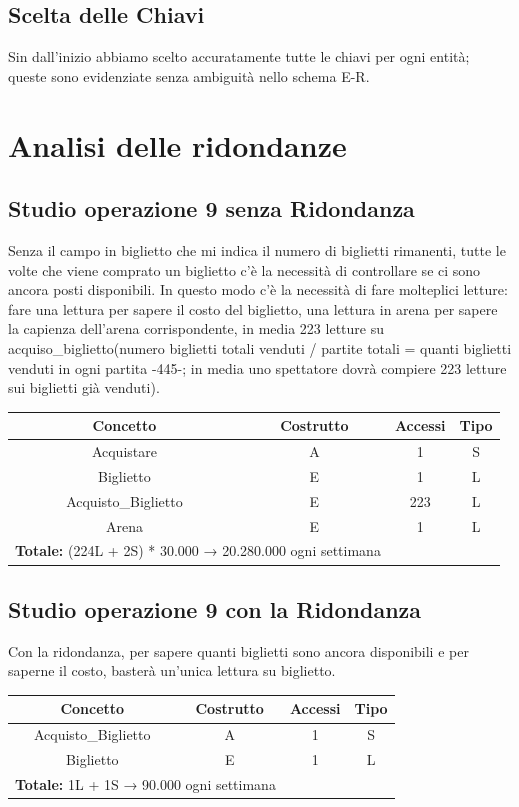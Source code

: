 \documentclass[a4paper,12pt]{report}
\begin{document}
\subsection*{Scelta delle Chiavi}
Sin dall'inizio abbiamo scelto accuratamente tutte le chiavi per ogni entità; queste sono evidenziate senza ambiguità nello schema E-R.
\section{Analisi delle ridondanze}
\subsection*{Studio operazione 9 senza Ridondanza}
Senza il campo in biglietto che mi indica il numero di biglietti rimanenti, tutte le volte che viene comprato un biglietto c'è la necessità di controllare se ci sono ancora posti disponibili. In questo modo c'è la necessità di fare molteplici letture: fare una lettura per sapere il costo del biglietto, una lettura in arena per sapere la capienza dell'arena corrispondente, in media 223 letture su acquiso\_biglietto(numero biglietti totali venduti / partite totali = quanti biglietti venduti in ogni partita -445-; in media uno spettatore dovrà compiere 223 letture sui biglietti già venduti).
\begin{center}
	\begin{tabular}{|c|c|c|c|}
		\hline\rowcolor{pink}
		Concetto & Costrutto & Accessi & Tipo\\
		\hline\hline		
		Acquistare & A & 1 & S\\
		Biglietto & E & 1 & L\\
		Acquisto\_Biglietto & E & 223 & L\\
		Arena & E & 1 & L\\
		\hline
		\hline
		\multicolumn{2}{l}{%
			\textbf{Totale:} (224L + 2S) * 30.000 → 20.280.000 ogni settimana} \\
		\hline
	\end{tabular}
\end{center}
\subsection*{Studio operazione 9 con la Ridondanza}
Con la ridondanza, per sapere quanti biglietti sono ancora disponibili e per saperne il costo, basterà un'unica lettura su biglietto.
\begin{center}
	\begin{tabular}{|c|c|c|c|}
		\hline\rowcolor{pink}
		Concetto & Costrutto & Accessi & Tipo\\
		\hline\hline		
		Acquisto\_Biglietto & A & 1 & S\\
		Biglietto & E & 1 & L\\		
		\hline
		\hline
		\multicolumn{2}{l}{%
			\textbf{Totale:} 1L + 1S → 90.000 ogni settimana} \\
		\hline
	\end{tabular}
\end{center}
\end{document}
